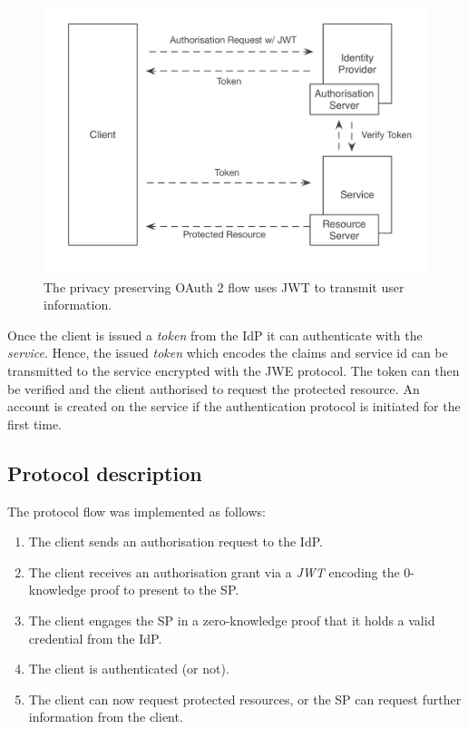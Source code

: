 \begin{figure}
\includegraphics[width=\textwidth]{figures/PrivateFlow.png}
\caption[Privacy Preserving OAuth Flow with JWT.]{The privacy preserving OAuth 2 flow uses JWT to transmit user information.
\label{fig:privateflow}}
\end{figure}

Once the client is issued a \emph{token} from the IdP it can authenticate with the \emph{service}. Hence, the issued \emph{token} which encodes the claims and service id can be transmitted to the service encrypted with the JWE protocol. The token can then be verified and the client authorised to request the protected resource. An account is created on the service if the authentication protocol is initiated for the first time.

\subsection{Protocol description}

The protocol flow was implemented as follows:
\begin{enumerate}
    \item The client sends an authorisation request to the IdP.
    \item The client receives an authorisation grant via a \emph{JWT} encoding the 0-knowledge proof to present to the SP.
    \item The client engages the SP in a zero-knowledge proof that it holds a valid credential from the IdP.
    \item The client is authenticated (or not).
    \item The client can now request protected resources, or the SP can request further information from the client.
\end{enumerate}

